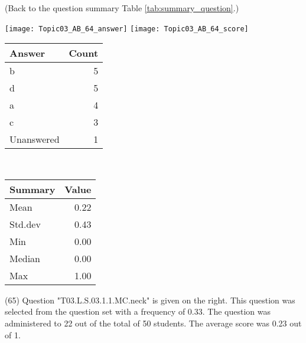\documentclass[12pt,english,nohyper]{tufte-handout}\usepackage[]{graphicx}\usepackage[]{color}
\begin{document}
 (Back to the question summary Table \ref{tab:summary_question}.)

\begin{center} \texttt{[image: Topic03\_AB\_64\_answer]} \texttt{[image: Topic03\_AB\_64\_score]} \end{center} 

\begin{center}%
\begin{tabular}{lr}
  \hline
Answer & Count \\ 
  \hline
b &   5 \\ 
  d &   5 \\ 
  a &   4 \\ 
  c &   3 \\ 
  Unanswered &   1 \\ 
   \hline
\end{tabular}
~~~~~~~~%
\begin{tabular}{lr}
  \hline
Summary & Value \\ 
  \hline
Mean & 0.22 \\ 
  Std.dev & 0.43 \\ 
  Min & 0.00 \\ 
  Median & 0.00 \\ 
  Max & 1.00 \\ 
   \hline
\end{tabular}
\end{center}\newpage{} (65) Question "T03.L.S.03.1.1.MC.neck" is given on the right. This question was selected from the question set with a frequency of 0.33. The question was administered to 22 out of the total of 50 students. The average score was 0.23 out of 1.
\end{document}

